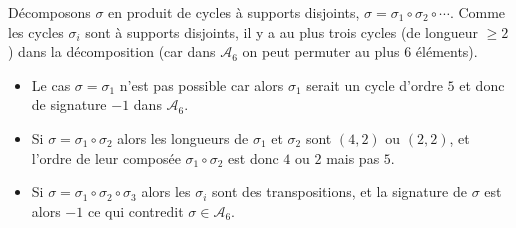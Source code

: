 {\begin{enumerate}
{Décomposons $\sigma$ en produit de cycles à supports disjoints,
$\sigma = \sigma_1 \circ \sigma_2 \circ \cdots$. Comme les cycles
$\sigma_i$ sont à supports disjoints, il y a au plus trois cycles
(de longueur $\geq 2$) dans la décomposition (car dans
$\mathcal{A}_6$ on peut permuter au plus $6$ éléments).
\begin{itemize}
\item Le cas $\sigma = \sigma_1$ n'est pas possible car alors $\sigma_1$ serait un cycle d'ordre $5$ et donc
de signature $-1$ dans $\mathcal{A}_6$.
\item Si $\sigma = \sigma_1 \circ \sigma_2$ alors les longueurs de $\sigma_1$
  et $\sigma_2$ sont $(4,2)$ ou $(2,2)$, et l'ordre de leur composée
  $\sigma_1 \circ \sigma_2$ est donc $4$ ou $2$ mais pas $5$.
\item Si $\sigma = \sigma_1 \circ \sigma_2 \circ \sigma_3$ alors
les $\sigma_i$ sont des transpositions, et la signature de
$\sigma$ est alors $-1$ ce qui contredit $\sigma \in
\mathcal{A}_6$.
\end{itemize}
}
\end{enumerate}
}
